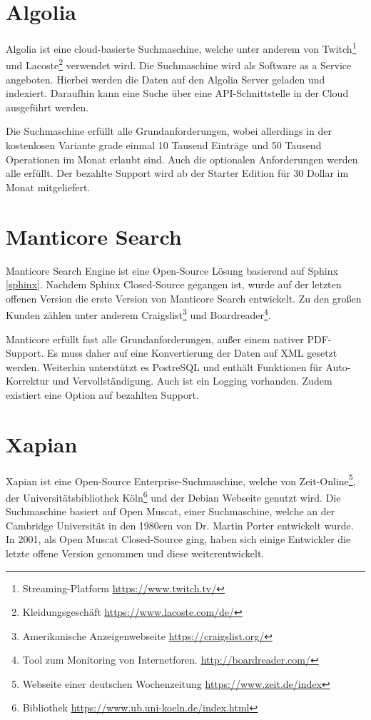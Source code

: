 \section{Algolia}
\label{algolia}

Algolia ist eine cloud-basierte Suchmaschine, welche unter anderem von Twitch\footnote{Streaming-Platform \url{https://www.twitch.tv/}} und Lacoste\footnote{Kleidungsgeschäft \url{https://www.lacoste.com/de/}} verwendet wird. Die Suchmaschine wird als Software as a Service angeboten. Hierbei werden die Daten auf den Algolia Server geladen und indexiert. Daraufhin kann eine Suche über eine API-Schnittstelle in der Cloud ausgeführt werden.

Die Suchmaschine erfüllt alle Grundanforderungen, wobei allerdings in der kostenlosen Variante grade einmal 10 Tausend Einträge und 50 Tausend Operationen im Monat erlaubt sind. Auch die optionalen Anforderungen werden alle erfüllt. Der bezahlte Support wird ab der Starter Edition für 30 Dollar im Monat mitgeliefert. \cite{Algolia.2019}

\section{Manticore Search}
\label{manticore}

Manticore Search Engine ist eine Open-Source Lösung basierend auf Sphinx \ref{sphinx}. Nachdem Sphinx Closed-Source gegangen ist, wurde auf der letzten offenen Version die erste Version von Manticore Search entwickelt. Zu den großen Kunden zählen unter anderem Craigslist\footnote{Amerikanische Anzeigenwebseite \url{https://craigslist.org/}} und Boardreader\footnote{Tool zum Monitoring von Internetforen. \url{http://boardreader.com/}}.

Manticore erfüllt fast alle Grundanforderungen, außer einem nativer PDF-Support. Es muss daher auf eine Konvertierung der Daten auf XML gesetzt werden. Weiterhin unterstützt es PostreSQL und enthält Funktionen für Auto-Korrektur und Vervollständigung. Auch ist ein Logging vorhanden. Zudem existiert eine Option auf bezahlten Support. \cite{ManticoreSoftwareLtd.2019}

\section{Xapian}
\label{xapian}

Xapian ist eine Open-Source Enterprise-Suchmaschine, welche von Zeit-Online\footnote{Webseite einer deutschen Wochenzeitung \url{https://www.zeit.de/index}}, der Universitätsbibliothek Köln\footnote{Bibliothek \url{https://www.ub.uni-koeln.de/index.html}} und der Debian Webseite genutzt wird. Die Suchmaschine basiert auf Open Muscat, einer Suchmaschine, welche an der Cambridge Universität in den 1980ern von Dr. Martin Porter entwickelt wurde. In 2001, als Open Muscat Closed-Source ging, haben sich einige Entwickler die letzte offene Version genommen und diese weiterentwickelt.

